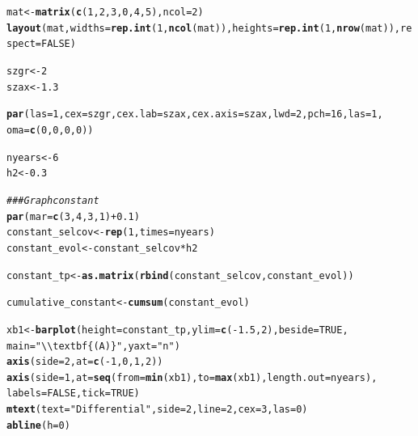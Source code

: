 \documentclass{article}\usepackage[]{graphicx}\usepackage[]{color}
\makeatletter
\newcommand{\hlnum}[1]{\textcolor[rgb]{0.686,0.059,0.569}{#1}}%
\newcommand{\hlstr}[1]{\textcolor[rgb]{0.192,0.494,0.8}{#1}}%
\newcommand{\hlcom}[1]{\textcolor[rgb]{0.678,0.584,0.686}{\textit{#1}}}%
\newcommand{\hlopt}[1]{\textcolor[rgb]{0,0,0}{#1}}%
\newcommand{\hlstd}[1]{\textcolor[rgb]{0.345,0.345,0.345}{#1}}%
\newcommand{\hlkwb}[1]{\textcolor[rgb]{0.69,0.353,0.396}{#1}}%
\newcommand{\hlkwc}[1]{\textcolor[rgb]{0.333,0.667,0.333}{#1}}%
\newcommand{\hlkwd}[1]{\textcolor[rgb]{0.737,0.353,0.396}{\textbf{#1}}}%
\newenvironment{kframe}{%
 \def\at@end@of@kframe{}%
 \ifinner\ifhmode%
  \def\at@end@of@kframe{\end{minipage}}%
  \begin{minipage}{\columnwidth}%
 \fi\fi%
 \def\FrameCommand##1{\hskip\@totalleftmargin \hskip-\fboxsep
 \colorbox{shadecolor}{##1}\hskip-\fboxsep
     \hskip-\linewidth \hskip-\@totalleftmargin \hskip\columnwidth}%
 \MakeFramed {\advance\hsize-\width
   \@totalleftmargin\z@ \linewidth\hsize
   \@setminipage}}%
 {\par\unskip\endMakeFramed%
 \at@end@of@kframe}
\newenvironment{knitrout}{}{} %
\makeatother
\begin{document}
\begin{knitrout}
\color{fgcolor}\begin{kframe}
\begin{alltt}
\hlstd{mat} \hlkwb{<-} \hlkwd{matrix}\hlstd{(}\hlkwd{c}\hlstd{(}\hlnum{1}\hlstd{,} \hlnum{2}\hlstd{,} \hlnum{3}\hlstd{,} \hlnum{0}\hlstd{,} \hlnum{4}\hlstd{,} \hlnum{5}\hlstd{),}\hlkwc{ncol} \hlstd{=} \hlnum{2}\hlstd{)}
\hlkwd{layout}\hlstd{(mat,} \hlkwc{widths} \hlstd{=} \hlkwd{rep.int}\hlstd{(}\hlnum{1}\hlstd{,} \hlkwd{ncol}\hlstd{(mat)),} \hlkwc{heights} \hlstd{=} \hlkwd{rep.int}\hlstd{(}\hlnum{1}\hlstd{,} \hlkwd{nrow}\hlstd{(mat)),} \hlkwc{respect} \hlstd{=} \hlnum{FALSE} \hlstd{)}

\hlstd{szgr} \hlkwb{<-} \hlnum{2}
\hlstd{szax} \hlkwb{<-} \hlnum{1.3}

\hlkwd{par}\hlstd{(}\hlkwc{las}\hlstd{=}\hlnum{1}\hlstd{,} \hlkwc{cex}\hlstd{=szgr,} \hlkwc{cex.lab}\hlstd{=szax ,} \hlkwc{cex.axis}\hlstd{=szax,} \hlkwc{lwd}\hlstd{=}\hlnum{2} \hlstd{,}\hlkwc{pch}\hlstd{=}\hlnum{16}\hlstd{,} \hlkwc{las}\hlstd{=}\hlnum{1}\hlstd{,}
    \hlkwc{oma}\hlstd{=}\hlkwd{c}\hlstd{(}\hlnum{0}\hlstd{,}\hlnum{0}\hlstd{,}\hlnum{0}\hlstd{,}\hlnum{0}\hlstd{))}

\hlstd{nyears} \hlkwb{<-} \hlnum{6}
\hlstd{h2} \hlkwb{<-} \hlnum{0.3}

\hlcom{### Graph constant}
\hlkwd{par}\hlstd{(}\hlkwc{mar}\hlstd{=}\hlkwd{c}\hlstd{(}\hlnum{3}\hlstd{,} \hlnum{4}\hlstd{,} \hlnum{3}\hlstd{,} \hlnum{1}\hlstd{)} \hlopt{+} \hlnum{0.1}\hlstd{)}
\hlstd{constant_selcov} \hlkwb{<-} \hlkwd{rep}\hlstd{(}\hlnum{1}\hlstd{,} \hlkwc{times}\hlstd{=nyears)}
\hlstd{constant_evol} \hlkwb{<-} \hlstd{constant_selcov} \hlopt{*} \hlstd{h2}

\hlstd{constant_tp} \hlkwb{<-} \hlkwd{as.matrix}\hlstd{(}\hlkwd{rbind}\hlstd{(constant_selcov, constant_evol))}

\hlstd{cumulative_constant} \hlkwb{<-} \hlkwd{cumsum}\hlstd{(constant_evol)}

\hlstd{xb1} \hlkwb{<-} \hlkwd{barplot}\hlstd{(}\hlkwc{height} \hlstd{= constant_tp,} \hlkwc{ylim} \hlstd{=} \hlkwd{c}\hlstd{(}\hlopt{-}\hlnum{1.5}\hlstd{,}\hlnum{2}\hlstd{),} \hlkwc{beside} \hlstd{=} \hlnum{TRUE}\hlstd{,}
               \hlkwc{main}\hlstd{=}\hlstr{"\textbackslash{}\textbackslash{}textbf\{(A)\}"}\hlstd{,} \hlkwc{yaxt}\hlstd{=}\hlstr{"n"}\hlstd{)}
\hlkwd{axis}\hlstd{(}\hlkwc{side}\hlstd{=}\hlnum{2}\hlstd{,} \hlkwc{at} \hlstd{=} \hlkwd{c}\hlstd{(}\hlopt{-}\hlnum{1}\hlstd{,}\hlnum{0}\hlstd{,}\hlnum{1}\hlstd{,}\hlnum{2}\hlstd{))}
\hlkwd{axis}\hlstd{(}\hlkwc{side}\hlstd{=}\hlnum{1}\hlstd{,} \hlkwc{at} \hlstd{=} \hlkwd{seq}\hlstd{(}\hlkwc{from}\hlstd{=}\hlkwd{min}\hlstd{(xb1),} \hlkwc{to}\hlstd{=}\hlkwd{max}\hlstd{(xb1),} \hlkwc{length.out} \hlstd{= nyears),}
     \hlkwc{labels} \hlstd{=} \hlnum{FALSE}\hlstd{,}\hlkwc{tick} \hlstd{=} \hlnum{TRUE}\hlstd{)}
\hlkwd{mtext}\hlstd{(}\hlkwc{text} \hlstd{=} \hlstr{"Differential"}\hlstd{,} \hlkwc{side} \hlstd{=} \hlnum{2}\hlstd{,} \hlkwc{line} \hlstd{=} \hlnum{2}\hlstd{,} \hlkwc{cex}\hlstd{=}\hlnum{3}\hlstd{,} \hlkwc{las}\hlstd{=}\hlnum{0}\hlstd{)}
\hlkwd{abline}\hlstd{(}\hlkwc{h}\hlstd{=}\hlnum{0}\hlstd{)}


\end{alltt}
\end{kframe}
\end{knitrout}
\end{document}
